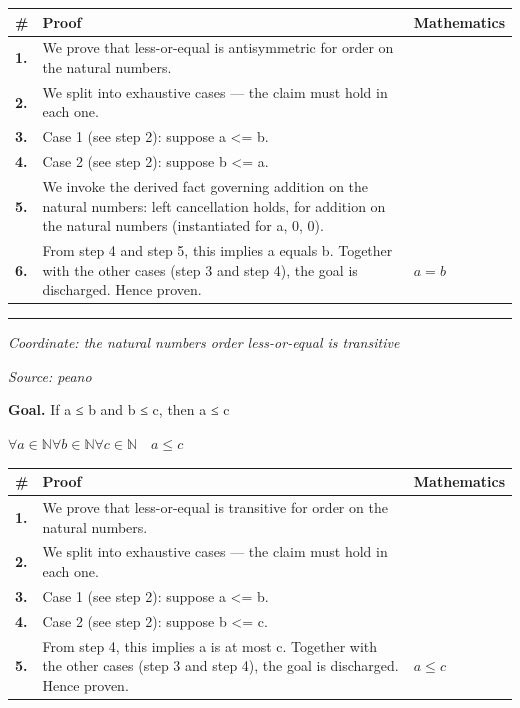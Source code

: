 \documentclass[11pt]{article}
\theoremstyle{definition}
\begin{document}
\medskip
\noindent
\begin{tabular}{@{} >{\raggedright\arraybackslash}p{} >{\raggedright\arraybackslash}p{} >{\raggedleft\arraybackslash}p{} @{}}
\textbf{\#} & \textbf{Proof} & \textbf{Mathematics} \\
\midrule
\textbf{1.} & We prove that less-or-equal is antisymmetric for order on the natural numbers. & \\[0.45em]
\textbf{2.} & We split into exhaustive cases — the claim must hold in each one. & \\[0.45em]
\textbf{3.} & Case 1 (see step 2): suppose a <= b. & \\[0.45em]
\textbf{4.} & Case 2 (see step 2): suppose b <= a. & \\[0.45em]
\textbf{5.} & We invoke the derived fact governing addition on the natural numbers: left cancellation holds, for addition on the natural numbers (instantiated for a, 0, 0). & \\[0.45em]
\textbf{6.} & From step 4 and step 5, this implies a equals b. Together with the other cases (step 3 and step 4), the goal is discharged. Hence proven. & $\displaystyle a = b$ \\[0.45em]
\bottomrule
\end{tabular}
\label{thm:Nat-order-less_or_equal_is_antisymmetric}
\par\medskip\hrule
\bigskip
{}\par
\smallskip\noindent\textit{Coordinate: the natural numbers \cdot order \cdot less-or-equal is transitive}\par
\smallskip\noindent\textit{Source: peano}\par
\medskip
\noindent\textbf{Goal.} If a ≤ b and b ≤ c, then a ≤ c\par
\noindent$\displaystyle \forall a \in \mathbb{N} \forall b \in \mathbb{N} \forall c \in \mathbb{N}\quad a \le c$\par
\medskip
\noindent
\begin{tabular}{@{} >{\raggedright\arraybackslash}p{} >{\raggedright\arraybackslash}p{} >{\raggedleft\arraybackslash}p{} @{}}
\textbf{\#} & \textbf{Proof} & \textbf{Mathematics} \\
\midrule
\textbf{1.} & We prove that less-or-equal is transitive for order on the natural numbers. & \\[0.45em]
\textbf{2.} & We split into exhaustive cases — the claim must hold in each one. & \\[0.45em]
\textbf{3.} & Case 1 (see step 2): suppose a <= b. & \\[0.45em]
\textbf{4.} & Case 2 (see step 2): suppose b <= c. & \\[0.45em]
\textbf{5.} & From step 4, this implies a is at most c. Together with the other cases (step 3 and step 4), the goal is discharged. Hence proven. & $\displaystyle a \le c$ \\[0.45em]
\bottomrule
\end{tabular}
\end{document}
